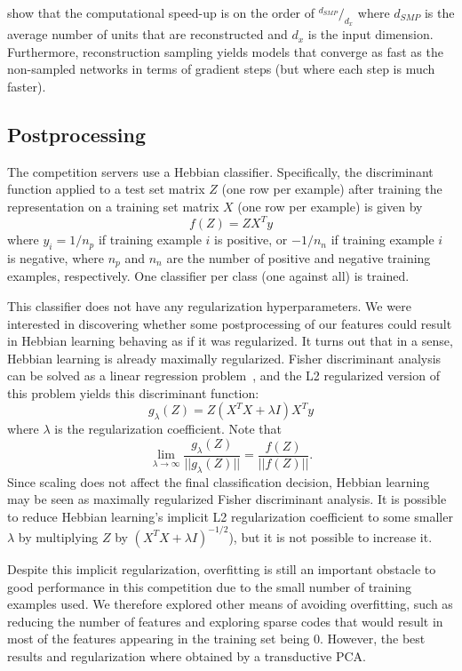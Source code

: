 \citep{Dauphin+al-2011} show that the computational speed-up is on the order of
$^{d_{SMP}}/_{d_x}$ where $d_{SMP}$ is the average number of units that are
reconstructed and $d_x$ is the input dimension. Furthermore, reconstruction sampling
yields models that converge as fast as the non-sampled networks in terms of gradient steps
(but where each step is much faster).


\subsection{Postprocessing}

The competition servers use a Hebbian classifier. Specifically,
the discriminant function applied to a test set matrix 
$Z$ (one row per example) after training
the representation on a training set matrix $X$ (one row per example) is given by
\[ f(Z) = Z X^T y \]
where $y_i = 1 / n_p$ if training example $i$ is positive,
or $-1/n_n$ if training example $i$ is negative, where $n_p$ and $n_n$
are the number of positive and negative training examples, respectively.
One classifier per class (one against all) is trained.

This classifier does not have any regularization hyperparameters.
We were interested in discovering whether some postprocessing of our
features could result in Hebbian learning behaving as if it was regularized.
It turns out that in a sense, Hebbian learning is already maximally
regularized. Fisher discriminant analysis can be solved as a linear
regression problem~\citep{bishop-book2006}, and the L2 regularized version
of this problem yields this discriminant function:
\[ g_\lambda(Z) = Z (X^T X + \lambda I) X^T y \]
where $\lambda$ is the regularization coefficient. Note that
\[ \lim_{\lambda\rightarrow\infty} \frac{g_\lambda(Z)}{||g_\lambda(Z)||} = \frac{f(Z)}{||f(Z)||}. \]
Since scaling does not affect the final classification
decision, Hebbian learning may be seen as maximally regularized Fisher
discriminant analysis. It is possible to reduce Hebbian learning's implicit
L2 regularization coefficient 
to some smaller $\lambda$ by multiplying $Z$ by $(X^TX+\lambda I)^{-1/2}$),
but it is not possible to increase it.

Despite this implicit regularization, overfitting is still an important
obstacle to good performance in this competition
due to the small number of training examples used. We therefore explored
other means of avoiding overfitting, such as reducing the number of features
and exploring sparse codes that would result in most of the features
appearing in the training set being 0. However, the best results
and regularization where obtained by a transductive PCA.

